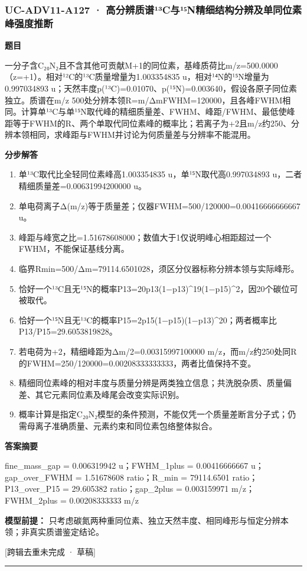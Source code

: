 \documentclass[UTF8,11pt,a4paper]{ctexart}
\begin{document}
\subsubsection*{UC-ADV11-A127 · 高分辨质谱¹³C与¹⁵N精细结构分辨及单同位素峰强度推断}
\noindent\textbf{题目}\par
一分子含C₂₀N₂且不含其他可贡献M+1的同位素，基峰质荷比m/z=500.0000（z=+1）。相对¹²C的¹³C质量增量为1.003354835 u，相对¹⁴N的¹⁵N增量为0.997034893 u；天然丰度p(¹³C)=0.01070、p(¹⁵N)=0.003640，假设各原子同位素独立。质谱在m/z 500处分辨本领R=m/ΔmFWHM=120000，且各峰FWHM相同。计算单¹³C与单¹⁵N取代峰的精细质量差、FWHM、峰距/FWHM、最低使峰距等于FWHM的R、两个单取代同位素峰的概率比；若离子为+2且m/z约250、分辨本领相同，求峰距与FWHM并讨论为何质量差与分辨率不能混用。\par
\medskip\noindent\textbf{分步解答}
\begin{enumerate}
\item 单¹³C取代比全轻同位素峰高1.003354835 u，单¹⁵N取代高0.997034893 u，二者精细质量差=0.00631994200000 u。
\item 单电荷离子Δ(m/z)等于质量差；仪器FWHM=500/120000=0.00416666666667 u。
\item 峰距与峰宽之比=1.51678608000；数值大于1仅说明峰心相距超过一个FWHM，不能保证基线分离。
\item 临界Rmin=500/Δm=79114.6501028，须区分仪器标称分辨本领与实际峰形。
\item 恰好一个¹³C且无¹⁵N的概率P13=20p13(1−p13)\textasciicircum{}19(1−p15)\textasciicircum{}2，因20个碳位可被取代。
\item 恰好一个¹⁵N且无¹³C的概率P15=2p15(1−p15)(1−p13)\textasciicircum{}20；两者概率比P13/P15=29.6053819828。
\item 若电荷为+2，精细峰距为Δm/2=0.00315997100000 m/z，而m/z约250处同R的FWHM=250/120000=0.00208333333333，两者比值保持不变。
\item 精细同位素峰的相对丰度与质量分辨是两类独立信息；共洗脱杂质、质量偏差、其它元素同位素及峰尾会改变实际识别。
\item 概率计算是指定C₂₀N₂模型的条件预测，不能仅凭一个质量差断言分子式；仍需母离子准确质量、元素约束和同位素包络整体拟合。
\end{enumerate}
\noindent\textbf{答案摘要}\par
fine\_mass\_gap = 0.006319942 u；FWHM\_1plus = 0.00416666667 u；gap\_over\_FWHM = 1.51678608 ratio；R\_min = 79114.6501 ratio；P13\_over\_P15 = 29.605382 ratio；gap\_2plus = 0.003159971 m/z；FWHM\_2plus = 0.00208333333 m/z\par
\noindent\textbf{模型前提：}
只考虑碳氮两种重同位素、独立天然丰度、相同峰形与恒定分辨本领；非真实质谱鉴定结论。\par
\noindent\textcolor{red!65!black}{[跨辑去重未完成 · 草稿]} \par
\medskip\hrule\medskip
{}
\end{document}
